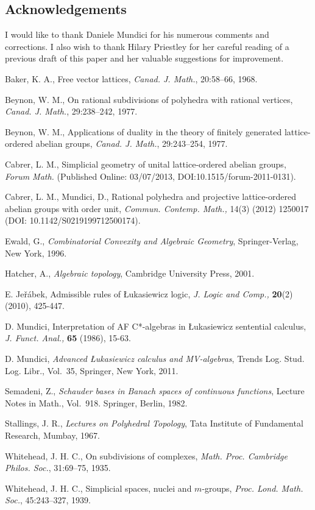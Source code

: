\documentclass[reqno, draft]{amsart}
\theoremstyle{definition}
\begin{document}
\subsection*{Acknowledgements}
I would like to thank Daniele Mundici  for his numerous comments and corrections. 
I also wish to thank Hilary Priestley for her careful reading of a previous draft of this paper and her valuable suggestions for improvement.
\begin{thebibliography}{10}
Baker, K. A.,
Free vector lattices,
{\it Canad. J. Math.},  {  20}:58--66, 1968.

Beynon, W. M.,
On rational subdivisions of polyhedra with rational vertices,
{\it Canad. J. Math.}, 
{29}:238--242,  1977.

 Beynon, W. M.,
Applications of duality in the theory of
finitely generated lattice-ordered abelian groups,
{\it Canad. J. Math.},  
{29}:243--254, 1977.

Cabrer, L. M., 
Simplicial geometry of unital lattice-ordered abelian groups, 
{\it Forum Math.} 
(Published Online: 03/07/2013, DOI:10.1515/forum-2011-0131).

Cabrer, L. M., Mundici, D.,
Rational polyhedra and projective lattice-ordered abelian groups 
with order unit,
{\it Commun. Contemp. Math.,}
 14(3) (2012) 1250017\\
(DOI: 10.1142/S0219199712500174).

  Ewald, G.,
  {\it Combinatorial Convexity and Algebraic Geometry},
  Springer-Verlag, New York, 1996.

  Hatcher, A., 
  {\it Algebraic topology}, 
  Cambridge University Press, 2001.

   E. Je\v{r}\'abek,
   Admissible rules of \L ukasiewicz logic,
   {\it J. Logic and Comp.,}
   {\bf 20}(2) (2010), 425-447.

   D. Mundici,
   Interpretation of    AF C*-algebras in \L ukasiewicz sentential calculus,
   {\it J. Funct. Anal.,}
   {\bf 65} (1986), 15-63.

   D. Mundici,
   {\it Advanced  \L ukasiewicz calculus and MV-algebras},
   Trends Log. Stud. Log. Libr., Vol.~35, Springer, New York, 2011.

Semadeni, Z., 
{\it Schauder bases in Banach spaces of continuous functions},
Lecture Notes in Math., Vol.~918. 
Springer, Berlin, 1982.

Stallings, J. R.,
{\it Lectures on Polyhedral Topology},
Tata Institute of Fundamental Research,
Mumbay, 1967.

Whitehead, J. H. C.,
On subdivisions of complexes,
{\it Math. Proc. Cambridge Philos. Soc.},  
{  31}:69--75, 1935.

Whitehead, J. H. C.,
Simplicial spaces, nuclei and $m$-groups,
{\it Proc. Lond. Math. Soc.},  
{  45}:243--327, 1939.

\end{thebibliography}
\end{document}
